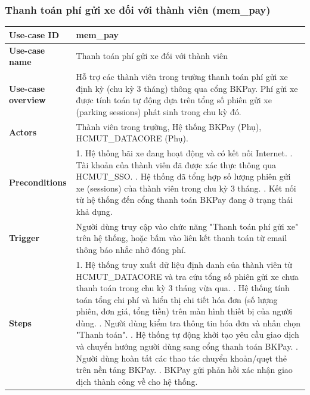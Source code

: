 \subsubsection{Thanh toán phí gửi xe đối với thành viên (mem\_pay)}
\begingroup
\small
\begin{longtable}{|>{\centering\arraybackslash}m{3cm}|m{13.7cm}|}
\hline
\textbf{Use-case ID} & mem\_pay \\ \hline
\textbf{Use-case name} & Thanh toán phí gửi xe đối với thành viên \\ \hline
\textbf{Use-case overview} & Hỗ trợ các thành viên trong trường thanh toán phí gửi xe định kỳ (chu kỳ 3 tháng) thông qua cổng BKPay. Phí gửi xe được tính toán tự động dựa trên tổng số phiên gửi xe (parking sessions) phát sinh trong chu kỳ đó. \\ \hline
\textbf{Actors} & Thành viên trong trường, Hệ thống BKPay (Phụ), HCMUT\_DATACORE (Phụ). \\ \hline
\textbf{Preconditions} & 
1. Hệ thống bãi xe đang hoạt động và có kết nối Internet. \newline
2. Tài khoản của thành viên đã được xác thực thông qua HCMUT\_SSO. \newline
3. Hệ thống đã tổng hợp số lượng phiên gửi xe (sessions) của thành viên trong chu kỳ 3 tháng. \newline
4. Kết nối từ hệ thống đến cổng thanh toán BKPay đang ở trạng thái khả dụng. \\ \hline
\textbf{Trigger} & Người dùng truy cập vào chức năng "Thanh toán phí gửi xe" trên hệ thống, hoặc bấm vào liên kết thanh toán từ email thông báo nhắc nhở đóng phí. \\ \hline
\textbf{Steps} & 
1. Hệ thống truy xuất dữ liệu định danh của thành viên từ HCMUT\_DATACORE và tra cứu tổng số phiên gửi xe chưa thanh toán trong chu kỳ 3 tháng vừa qua. \newline
2. Hệ thống tính toán tổng chi phí và hiển thị chi tiết hóa đơn (số lượng phiên, đơn giá, tổng tiền) trên màn hình thiết bị của người dùng. \newline
3. Người dùng kiểm tra thông tin hóa đơn và nhấn chọn "Thanh toán". \newline
4. Hệ thống tự động khởi tạo yêu cầu giao dịch và chuyển hướng người dùng sang cổng thanh toán BKPay. \newline
5. Người dùng hoàn tất các thao tác chuyển khoản/quẹt thẻ trên nền tảng BKPay. \newline
6. BKPay gửi phản hồi xác nhận giao dịch thành công về cho hệ thống. \newline

\end{longtable}
